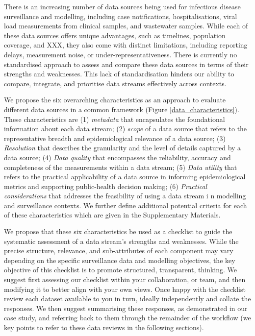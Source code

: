 \documentclass{article}
\begin{document}
There is an increasing number of data sources being used for infectious disease surveillance and modelling, including case notifications, hospitalisations, viral load measurements from clinical samples, and wastewater samples. While each of these data sources offers unique advantages, such as timelines, population coverage, and XXX, they also come with distinct limitations, including reporting delays,  measurement noise, or under-representativeness. There is currently no standardised approach to assess and compare these data sources in terms of their strengths and weaknesses. This lack of standardisation hinders our ability to compare, integrate, and prioritise data streams effectively across contexts. 

We propose the six overarching characteristics as an approach to evaluate different data sources in a common framework (Figure \ref{data_characteristics}).  These characteristics are (1) \textit{metadata}  that encapsulates the foundational information about each data stream; (2) \textit{scope} of a data source that refers to the representative breadth and epidemiological relevance of a data source; (3) \textit{Resolution} that describes the granularity and the level of details captured by a data source; (4) \textit{Data quality} that encompasses the reliability, accuracy and completeness of the measurements within a data stream; (5) \textit{Data utility} that refers to the practical applicability of a data source in informing epidemiological metrics and supporting public-health decision making; (6)\textit{ Practical considerations} that addresses the feasibility of using a data stream i n modelling and surveillance contexts. We further define additional potential criteria for each of these characteristics which are given in the Supplementary Materials. 

We propose that these six characteristics be used as a checklist to guide the systematic assessment of a data stream's strengths and weaknesses. While the precise structure, relevance, and sub-attributes of each component may vary depending on the specific surveillance data and modelling objectives, the key objective of this checklist is to promote structured, transparent, thinking. We suggest first assessing our checklist within your collaboration, or team,  and then modifying it to better align with your own views. Once happy with the checklist review each dataset available to you in turn, ideally independently and collate the responses. We then suggest summarising these responses, as demonstrated in our case study, and referring back to them through the remainder of the workflow (we key points to refer to these data reviews in the following sections).
\end{document}
